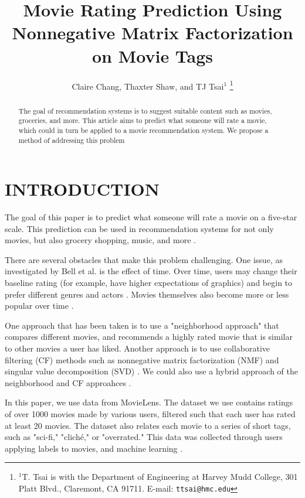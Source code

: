 \documentclass[letterpaper, 10 pt, conference]{ieeeconf}  %
\title{\LARGE \bf
Movie Rating Prediction Using Nonnegative Matrix Factorization on Movie Tags
}
\author{Claire Chang, Thaxter Shaw, and TJ Tsai$^{1}$%
\thanks{$^{1}$T. Tsai is with the Department of Engineering at Harvey Mudd College,
301 Platt Blvd., Claremont, CA 91711. E-mail: {\tt\small ttsai@hmc.edu}}%
}
\begin{document}
\maketitle
\thispagestyle{empty}
\pagestyle{empty}


\begin{abstract}

The goal of recommendation systems is to suggest suitable content such as movies, groceries, and more. This article aims to predict what someone will rate a movie, which could in turn be applied to a movie recommendation system. We propose a method of addressing this problem 

\end{abstract}


\section{INTRODUCTION}

The goal of this paper is to predict what someone will rate a movie on a five-star scale.
This prediction can be used in recommendation systems for not only movies, but also grocery shopping, music, and more \cite{recsys}.

There are several obstacles that make this problem challenging. 
One issue, as investigated by Bell et al. is the effect of time. Over time, users may change their baseline rating (for example, have higher expectations of graphics) and begin to prefer different genres and actors \cite{netflix}.
Movies themselves also become more or less popular over time \cite{netflix}.

One approach that has been taken is to use a "neighborhood approach" that compares different movies, and recommends a highly rated movie that is similar to other movies a user has liked. 
Another approach is to use collaborative filtering (CF) methods such as nonnegative matrix factorization (NMF) and singular value decomposition (SVD) \cite{cf}. 
We could also use a hybrid approach of the neighborhood and CF approahces \cite{hybrid}.

In this paper, we use data from MovieLens. The dataset we use contains ratings of over 1000 movies made by various users, filtered such that each user has rated at least 20 movies.
The dataset also relates each movie to a series of short tags, such as "sci-fi," "cliché," or "overrated." This data was collected through users applying labels to movies, and machine learning \cite{lenskitdata}.
\end{document}
